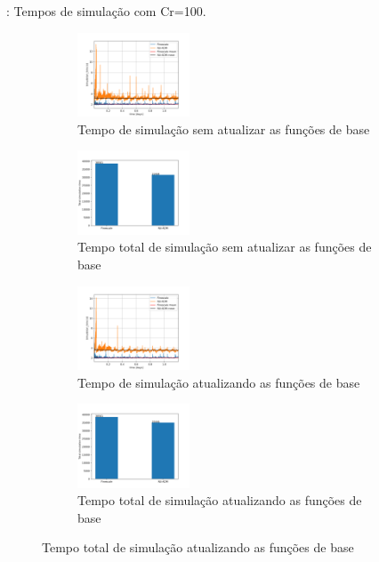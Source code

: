 \documentclass[professionalfont]{beamer}
\begin{document}
\begin{frame}{\FrameProblemName: {\small Tempos de simulação com Cr=100.}}
    \begin{figure}[!h]
        \centering
        \begin{subfigure}{.48\textwidth}
            \centering
            \includegraphics[height=2.5cm]{./imgs/pr2/3k_5000x1x1/cr 100/3k_5000_cr100_no_update/svgtopng/figura_case-finescale_3k_5000_CR100_no_updateTempo de simulaçãoActive_volumes.png}
            \caption{Tempo de simulação sem atualizar as funções de base}
        \end{subfigure}
        \hfill
        \begin{subfigure}{.48\textwidth}
            \centering
            \includegraphics[height=2.5cm]{./imgs/pr2/3k_5000x1x1/cr 100/3k_5000_cr100_no_update/svgtopng/figura_case-finescale_3k_5000_CR100_no_updateTotal_simulation_time.png}
            \caption{Tempo total de simulação sem atualizar as funções de base}
        \end{subfigure}
        \bigskip
        \begin{subfigure}[t]{.48\textwidth}
            \centering
            \includegraphics[height=2.5cm]{./imgs/pr2/3k_5000x1x1/cr 100/3k_5000_cr100_update/svgtopng/figura_case-finescale_3k_5000_CR100_updateTempo de simulaçãoActive_volumes.png}
            \caption{Tempo de simulação atualizando as funções de base}
        \end{subfigure}
        \hfill
        \begin{subfigure}[t]{.48\textwidth}
            \centering
            \includegraphics[height=2.5cm]{./imgs/pr2/3k_5000x1x1/cr 100/3k_5000_cr100_update/svgtopng/figura_case-finescale_3k_5000_CR100_updateTotal_simulation_time.png}
            \caption{Tempo total de simulação atualizando as funções de base}
        \end{subfigure}
    

\end{figure}
\end{frame}
\end{document}
